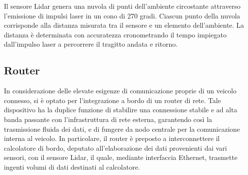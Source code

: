 \noindent Il sensore Lidar genera una nuvola di punti dell'ambiente circostante attraverso l'emissione di impulsi laser in un cono di 270 gradi. Ciascun punto della nuvola corrisponde alla distanza misurata tra il sensore e un elemento dell'ambiente. La distanza è determinata con accuratezza cronometrando il tempo impiegato dall'impulso laser a percorrere il tragitto andata e ritorno.

\subsection{Router}
In considerazione delle elevate esigenze di comunicazione proprie di un veicolo connesso, si è optato per l'integrazione a bordo di un router di rete. Tale dispositivo ha la duplice funzione di stabilire una connessione stabile e ad alta banda passante con l'infrastruttura di rete esterna, garantendo così la trasmissione fluida dei dati, e di fungere da nodo centrale per la comunicazione interna al veicolo. In particolare, il router è preposto a interconnettere il calcolatore di bordo, deputato all'elaborazione dei dati provenienti dai vari sensori, con il sensore Lidar, il quale, mediante interfaccia Ethernet, trasmette ingenti volumi di dati destinati al calcolatore.

